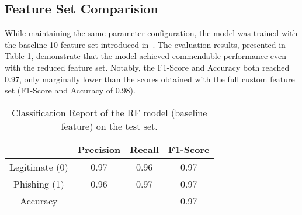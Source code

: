 \subsection{Feature Set Comparision}
While maintaining the same parameter configuration, the model was trained with the baseline 10-feature set
introduced in~\cite{CHIEW2019153}.
The evaluation results, presented in Table \ref{tab:rf_baseline_test_report}, demonstrate that the model
achieved commendable performance even with the reduced feature set. Notably, the F1-Score and Accuracy
both reached 0.97, only marginally lower than the scores obtained with the full custom feature set
(F1-Score and Accuracy of 0.98).

\begin{table}[ht!]
    \centering
    \begin{tabular}{|c|c|c|c|}
        \hline
         & Precision & Recall & F1-Score \\
        \hline
        Legitimate (0) & 0.97 & 0.96 & 0.97 \\
        Phishing (1) & 0.96 & 0.97 & 0.97 \\
        \hline
        Accuracy & & & 0.97  \\
        \hline
    \end{tabular}
    \caption{Classification Report of the RF model (baseline feature) on the test set.}
    \label{tab:rf_baseline_test_report}
\end{table}